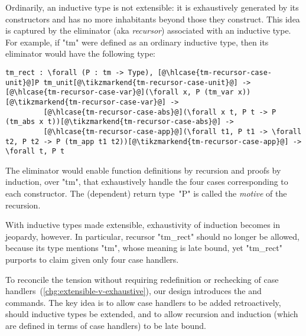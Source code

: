 
Ordinarily, an inductive type is not extensible: it is exhaustively
generated by its constructors and has no more inhabitants beyond those
they construct.
This idea is captured by the eliminator (aka \emph{recursor})
associated with an inductive type.
For example, if "tm" were defined as an ordinary inductive type, then
its eliminator would have the following type:

\begin{centered}
\begin{minipage}{.71\textwidth}
\newcommand\hlcase[1]{\tikzmarkin[disable rounded corners=true,set fill color=yellow!18,set border color=yellow!18]{#1}(0.00,-0.05)(-0.00,0.20)}
\begin{lstlisting}[basicstyle=\fontsize{8.25}{9.9}\ttfamily]
tm_rect : \forall (P : tm -> Type), [@\hlcase{tm-recursor-case-unit}@]P tm_unit[@\tikzmarkend{tm-recursor-case-unit}@] -> [@\hlcase{tm-recursor-case-var}@](\forall x, P (tm_var x))[@\tikzmarkend{tm-recursor-case-var}@] ->
         [@\hlcase{tm-recursor-case-abs}@](\forall x t, P t -> P (tm_abs x t))[@\tikzmarkend{tm-recursor-case-abs}@] ->
         [@\hlcase{tm-recursor-case-app}@](\forall t1, P t1 -> \forall t2, P t2 -> P (tm_app t1 t2))[@\tikzmarkend{tm-recursor-case-app}@] -> \forall t, P t
\end{lstlisting}
\end{minipage}
\end{centered}

\noindent
The eliminator would enable function definitions by recursion
and proofs by induction, over "tm", that exhaustively
handle the four cases corresponding to each constructor.
The (dependent) return type~"P" is called the \emph{motive} of the recursion.

With inductive types made extensible, exhaustivity of induction becomes
in jeopardy, however.
In particular, recursor "tm_rect" should no longer be allowed, because
its type mentions "tm", whose meaning is late bound, yet
"tm_rect" purports to claim  given only four case handlers.

To reconcile the tension without requiring redefinition or rechecking of
case handlers~(\ref{chg:extensible-v-exhaustive}),
our design introduces the  and  commands.
The key idea is to allow case handlers to be added retroactively, should
inductive types be extended, and to allow recursion and induction (which are defined in terms of case handlers) to be late bound.


